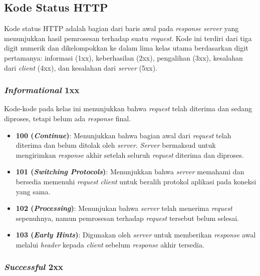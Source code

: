 \subsection{Kode Status HTTP}
\label{subsec:0201-kode-status-http}

Kode status HTTP adalah bagian dari baris awal pada \textit{response} \textit{server} yang menunjukkan hasil pemrosesan terhadap suatu \textit{request}. Kode ini terdiri dari tiga digit numerik dan dikelompokkan ke dalam lima kelas utama berdasarkan digit pertamanya: informasi (1xx), keberhasilan (2xx), pengalihan (3xx), kesalahan dari \textit{client} (4xx), dan kesalahan dari \textit{server} (5xx).

\subsubsection{\textit{Informational} 1xx}
\label{subsubsec:020104-infotmational-1xx}

Kode-kode pada kelas ini menunjukkan bahwa \textit{request} telah diterima dan sedang diproses, tetapi belum ada \textit{response} final.

\begin{itemize}
    \item \textbf{100 (\textit{Continue})}: Menunjukkan bahwa bagian awal dari \textit{request} telah diterima dan belum ditolak oleh \textit{server}. \textit{Server} bermaksud untuk mengirimkan \textit{response} akhir setelah seluruh \textit{request} diterima dan diproses.
  
    \item \textbf{101 (\textit{Switching Protocols})}: Menunjukkan bahwa \textit{server} memahami dan bersedia memenuhi \textit{request} \textit{client} untuk beralih protokol aplikasi pada koneksi yang sama.
  
    \item \textbf{102 (\textit{Processing})}: Menunjukan bahwa \textit{server} telah menerima \textit{request} sepenuhnya, namun pemrosesan terhadap \textit{request} tersebut belum selesai.~\cite{RFC2518}
  
    \item \textbf{103 (\textit{Early Hints})}: Digunakan oleh \textit{server} untuk memberikan \textit{response} awal melalui \textit{header} kepada \textit{client} sebelum \textit{response} akhir tersedia.~\cite{RFC8297}
  
\end{itemize}

\subsubsection{\textit{Successful} 2xx}
\label{subsubsec:201004-successful-2xx}

